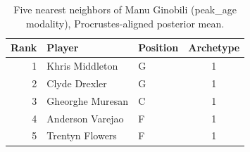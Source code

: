 \begin{table}[htbp]
  \centering\small
  \begin{tabular}{rllc}
    \toprule
    Rank & Player & Position & Archetype \\
    \midrule
    1 & Khris Middleton & G & 1 \\
    2 & Clyde Drexler & G & 1 \\
    3 & Gheorghe Muresan & C & 1 \\
    4 & Anderson Varejao & F & 1 \\
    5 & Trentyn Flowers & F & 1 \\
    \bottomrule
  \end{tabular}
  \caption{Five nearest neighbors of Manu Ginobili (peak_age modality), Procrustes-aligned posterior mean.}
  \label{tab:Manu_Ginobili_neighbors_peak_age}
\end{table}

